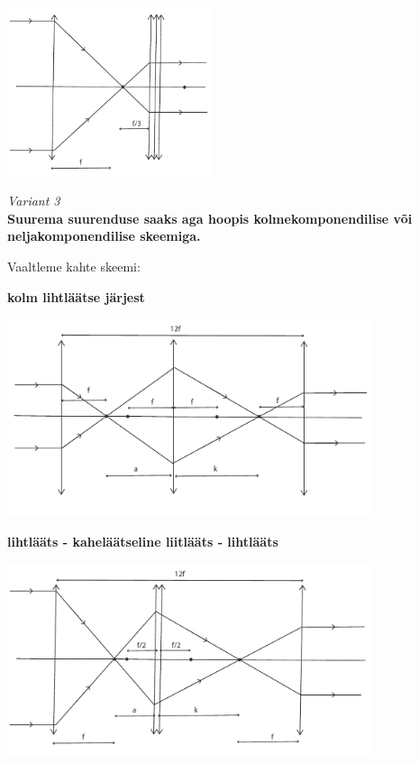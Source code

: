 \vspace{-10pt}
  \begin{center}
    \includegraphics[width=0.45\textwidth]{2020-v2g-10-sol2.pdf}
  \end{center}
  \vspace{-10pt}


\emph{Variant 3}\\
\textbf{Suurema suurenduse saaks aga hoopis kolmekomponendilise  või neljakomponendilise skeemiga.}

Vaaltleme kahte skeemi:

\textbf{kolm lihtläätse järjest}

\vspace{-10pt}
  \begin{center}
    \includegraphics[width=0.8\textwidth]{2020-v2g-10-sol3.pdf}
  \end{center}
  \vspace{-10pt}

\textbf{lihtlääts - kaheläätseline liitlääts - lihtlääts}

\vspace{-10pt}
  \begin{center}
    \includegraphics[width=0.8\textwidth]{2020-v2g-10-sol4.pdf}
  \end{center}
  \vspace{-10pt}


